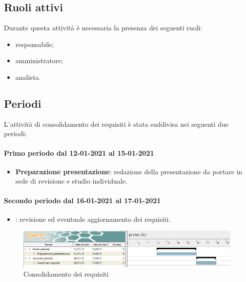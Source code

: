 	\subsection{Ruoli attivi}
	Durante questa attività è necessaria la presenza dei seguenti ruoli:
	\begin{itemize}
	\item responsabile;
	\item amministratore;
	\item analista.
	\end{itemize}

	\subsection{Periodi}
	L'attività di consolidamento dei requisiti è stata suddivisa nei seguenti due periodi:
	
	\paragraph{Primo periodo dal 12-01-2021 al 15-01-2021}
	\begin{itemize}
	
	\item \textbf{Preparazione presentazione}: redazione della presentazione da portare in sede di revisione e
	studio individuale.
	
	\end{itemize}	
	
	\paragraph{Secondo periodo dal 16-01-2021 al 17-01-2021}
	\begin{itemize}
		
	\item \textbf{}: revisione ed eventuale aggiornamento dei requisiti.
		
	\end{itemize}

	\newpage
	
	\begin{landscape}
		\begin{figure}[h!]
			\includegraphics[width=24cm]{images/2_Consolidamento_dei_requisiti.png}
			\caption{Consolidamento dei requisiti}
		\end{figure}
	\end{landscape}

